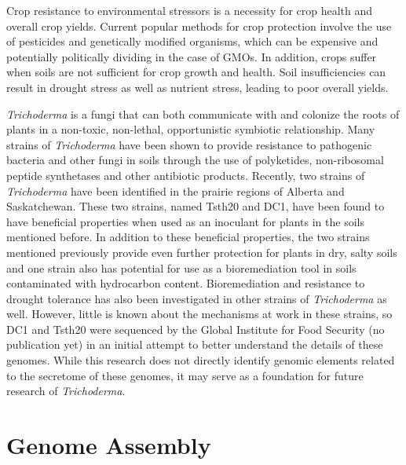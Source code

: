 Crop resistance to environmental stressors is a necessity for crop
health and overall crop yields. Current popular methods for crop
protection involve the use of pesticides and genetically modified
organisms, which can be expensive and potentially politically dividing
in the case of GMOs\cite{doi:10.1080/10408390600762696}. In addition,
crops suffer when soils are not sufficient for crop growth and
health. Soil insufficiencies can result in drought stress as well as
nutrient stress, leading to poor overall yields.

\textit{Trichoderma} is a fungi that can both communicate with and
colonize the roots of plants in a non-toxic, non-lethal, opportunistic
symbiotic relationship\cite{Woo2023}. Many strains of
\textit{Trichoderma} have been shown to provide resistance to
pathogenic bacteria and other fungi in soils through the use of
polyketides, non-ribosomal peptide synthetases and other antibiotic
products\cite{Woo2023}. Recently, two strains of \textit{Trichoderma}
have been identified in the prairie regions of Alberta and
Saskatchewan. These two strains, named Tsth20 and DC1, have been found
to have beneficial properties when used as an inoculant for plants in
the soils mentioned before. In addition to these beneficial
properties, the two strains mentioned previously provide even further
protection for plants in dry, salty soils and one strain also has
potential for use as a bioremediation tool in soils contaminated with
hydrocarbon content. Bioremediation and resistance to drought
tolerance has also been investigated in other strains of
\textit{Trichoderma} as well\cite{10.3389/fpls.2023.1190304}. However,
little is known about the mechanisms at work in these strains, so DC1
and Tsth20 were sequenced by the Global Institute for Food Security
(no publication yet) in an initial attempt to better understand the
details of these genomes. While this research does not directly
identify genomic elements related to the secretome of these genomes,
it may serve as a foundation for future research of
\textit{Trichoderma}.

\section{Genome Assembly}

